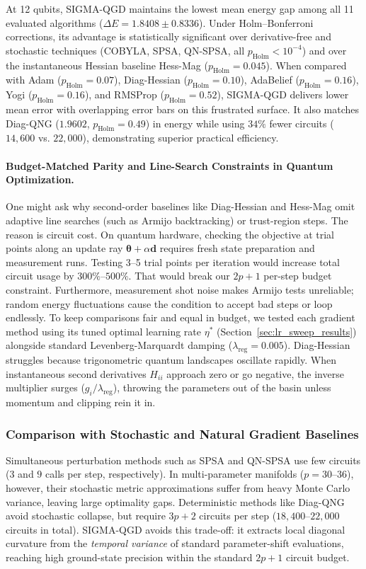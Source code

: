 \documentclass[11pt,a4paper]{article}
\begin{document}
At 12 qubits, SIGMA-QGD maintains the lowest mean energy gap among all 11 evaluated algorithms ($\Delta E = 1.8408 \pm 0.8336$). Under Holm--Bonferroni corrections, its advantage is statistically significant over derivative-free and stochastic techniques (COBYLA, SPSA, QN-SPSA, all $p_{\text{Holm}} < 10^{-4}$) and over the instantaneous Hessian baseline Hess-Mag ($p_{\text{Holm}} = 0.045$). When compared with Adam ($p_{\text{Holm}} = 0.07$), Diag-Hessian ($p_{\text{Holm}} = 0.10$), AdaBelief ($p_{\text{Holm}} = 0.16$), Yogi ($p_{\text{Holm}} = 0.16$), and RMSProp ($p_{\text{Holm}} = 0.52$), SIGMA-QGD delivers lower mean error with overlapping error bars on this frustrated surface. It also matches Diag-QNG ($1.9602$, $p_{\text{Holm}} = 0.49$) in energy while using $34\%$ fewer circuits ($14,600$ vs. $22,000$), demonstrating superior practical efficiency.

\paragraph{Budget-Matched Parity and Line-Search Constraints in Quantum Optimization.}
One might ask why second-order baselines like Diag-Hessian and Hess-Mag omit adaptive line searches (such as Armijo backtracking) or trust-region steps. The reason is circuit cost. On quantum hardware, checking the objective at trial points along an update ray $\boldsymbol{\theta} + \alpha \mathbf{d}$ requires fresh state preparation and measurement runs. Testing 3--5 trial points per iteration would increase total circuit usage by $300\%\text{--}500\%$. That would break our $2p+1$ per-step budget constraint. Furthermore, measurement shot noise makes Armijo tests unreliable; random energy fluctuations cause the condition to accept bad steps or loop endlessly. To keep comparisons fair and equal in budget, we tested each gradient method using its tuned optimal learning rate $\eta^*$ (Section~\ref{sec:lr_sweep_results}) alongside standard Levenberg-Marquardt damping ($\lambda_{\text{reg}} = 0.005$). Diag-Hessian struggles because trigonometric quantum landscapes oscillate rapidly. When instantaneous second derivatives $H_{ii}$ approach zero or go negative, the inverse multiplier surges ($g_i / \lambda_{\text{reg}}$), throwing the parameters out of the basin unless momentum and clipping rein it in.

\subsubsection{Comparison with Stochastic and Natural Gradient Baselines}
Simultaneous perturbation methods such as SPSA and QN-SPSA use few circuits ($3$ and $9$ calls per step, respectively). In multi-parameter manifolds ($p=30\text{--}36$), however, their stochastic metric approximations suffer from heavy Monte Carlo variance, leaving large optimality gaps. Deterministic methods like Diag-QNG~\cite{stokes2020quantum} avoid stochastic collapse, but require $3p+2$ circuits per step ($18,400\text{--}22,000$ circuits in total). SIGMA-QGD avoids this trade-off: it extracts local diagonal curvature from the \emph{temporal variance} of standard parameter-shift evaluations, reaching high ground-state precision within the standard $2p+1$ circuit budget.
\end{document}
